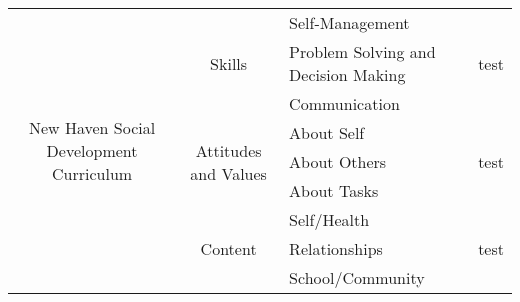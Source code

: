 \documentclass[landscape]{article}
\begin{document}
	\begin{tabular}{ccll}
		\toprule
		\multirow{9}{*}{\parbox[l]{3cm}{\raggedright\large New Haven Social Development Curriculum \footnotesize}} & \multirow{3}{*}{\normalsize Skills \footnotesize} & Self-Management & \multirow{3}{*}{test} \\
		 & & Problem Solving and Decision Making & \\
		 & & Communication & \\
		\cline{2-3}
		 & \multirow{3}{*}{\normalsize Attitudes and Values \footnotesize} & About Self & \multirow{3}{*}{test} \\
		 & & About Others & \\
		 & & About Tasks & \\
		 \cline{2-3}
		 & \multirow{3}{*}{\normalsize Content \footnotesize} & Self/Health & \multirow{3}{*}{test} \\
		 & & Relationships & \\
		 & & School/Community & \\
		 \bottomrule
	\end{tabular}
\end{document}
